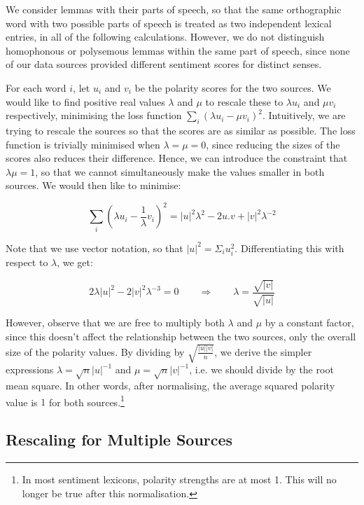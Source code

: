 \documentclass[11pt]{article}
\begin{document}
We consider lemmas with their parts of speech, so that the same orthographic word with two possible parts of speech is treated as two independent lexical entries, in all of the following calculations.  However, we do not distinguish homophonous or polysemous lemmas within the same part of speech, since none of our data sources provided different sentiment scores for distinct senses.

For each word $i$, let $u_{i}$ and $v_{i}$ be the polarity scores
for the two sources. We would like to find positive real values $\lambda$
and $\mu$ to rescale these to $\lambda u_{i}$ and $\mu v_{i}$ respectively,
minimising the loss function $\sum_{i}\left(\lambda u_{i}-\mu v_{i}\right)^{2}$.
Intuitively, we are trying to rescale the sources so that the scores
are as similar as possible. The loss function is trivially minimised
when $\lambda=\mu=0$, since reducing the sizes of the scores also
reduces their difference. Hence, we can introduce the constraint that
$\lambda\mu=1$, so that we cannot simultaneously make the values
smaller in both sources. We would then like to minimise:

\[
\sum_{i}\left(\lambda u_{i}-\frac{1}{\lambda}v_{i}\right)^{2}
= \left|u\right|^{2}\lambda^{2}-2u.v+\left|v\right|^{2}\lambda^{-2}
\]

Note that we use vector notation, so that $\left|u\right|^{2}=\Sigma_{i}u_{i}^{2}$.
Differentiating this with respect to $\lambda$, we get:

\[2\lambda\left|u\right|^{2}-2\left|v\right|^{2}\lambda^{-3} = 0 \qquad \Rightarrow \qquad \lambda = \frac{\sqrt{\left|v\right|}}{\sqrt{\left|u\right|}} \]

However, observe that we are free to multiply both $\lambda$ and $\mu$ by a constant factor,
since this doesn't affect the relationship between the two sources, only the overall size of the polarity values.
By dividing by $\sqrt{\frac{\left|u\right|\left|v\right|}{n}}$, we derive
the simpler expressions $\lambda=\sqrt{n}\left|u\right|^{-1}$ and $\mu=\sqrt{n}\left|v\right|^{-1}$,
i.e. we should divide by the root mean square. In other words,
after normalising, the average squared polarity value is $1$ for
both sources.\footnote{In most sentiment lexicons, polarity strengths are at most 1.  This will no longer be true after this normalisation.}


\subsection{Rescaling for Multiple Sources}
\end{document}
